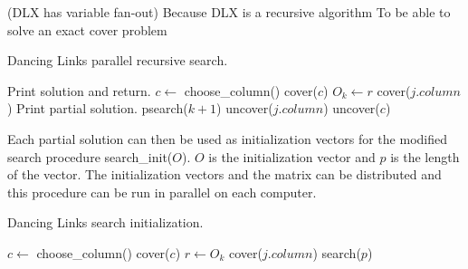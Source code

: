  
(DLX has variable fan-out)
Because DLX is a recursive algorithm 
To be able to solve an exact cover problem 

\begin{algorithm}[H]
	\caption{Dancing Links parallel recursive search.}
	\label{dlx_dsearch}
	\begin{distribalgo}[1]
				\STATE Print solution and return.  
			\ENDIF
			\STATE $c \leftarrow$ choose\_column()
			\STATE cover($c$)
				\STATE $O_k \leftarrow r$  
					\STATE cover($j.column$)
				\ENDFOR
					\STATE Print partial solution.
				\ELSE
					\STATE psearch($k + 1$)
				\ENDIF
					\STATE uncover($j.column$)
				\ENDFOR
			\ENDFOR
			\STATE uncover($c$)
		\ENDPROC
	\end{distribalgo}
\end{algorithm}

Each partial solution can then be used as initialization vectors for the modified search procedure search\_init($O$).
$O$ is the initialization vector and $p$ is the length of the vector.
The initialization vectors and the matrix can be distributed and this procedure can be run in parallel on each computer.

\begin{algorithm}[H]
	\caption{Dancing Links search initialization.}
	\label{dlx_isearch}
	\begin{distribalgo}[1]
				\STATE $c \leftarrow$ choose\_column()
				\STATE cover($c$)
				\STATE $r \leftarrow O_k$
					\STATE cover($j.column$)
				\ENDFOR
			\ENDFOR
			\STATE search($p$)  
		\ENDPROC
	\end{distribalgo}
\end{algorithm}

